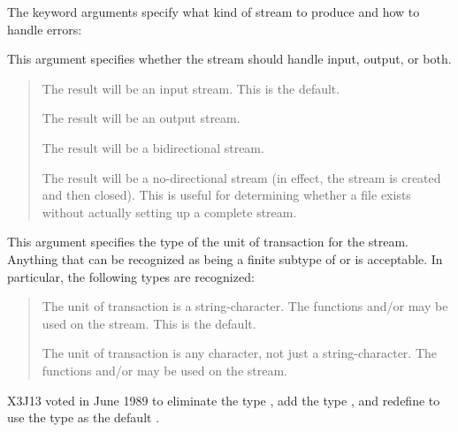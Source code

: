 \begin{defun}[Function]
The keyword arguments specify what kind of stream to produce and how
to handle errors:
\begin{flushdesc}
\item[\cd{:direction}]
This argument specifies whether the stream should handle input, output,
or both.
\begin{quotation}
\begin{flushdesc}
\item[\cd{:input}]
The result will be an input stream.  This is the default.

\item[\cd{:output}]
The result will be an output stream.

\item[\cd{:io}]
The result will be a bidirectional stream.

\item[\cd{:probe}]
The result will be a no-directional stream (in effect, the stream
is created and then closed).  This is useful for determining whether
a file exists without actually setting up a complete stream.
\end{flushdesc}
\end{quotation}

\item[\cd{:element-type}]
This argument specifies the type of the unit of transaction for the stream.
Anything that can be recognized as being a finite subtype of
 or  is acceptable.  In particular,
the following types are recognized:

\begin{obsolete}
\begin{quotation}
\begin{flushdesc}
\item[\cd{string-char}]
The unit of transaction is a string-character.
The functions  and/or  may be
used on the stream.  This is the default.

\item[\cd{character}]
The unit of transaction is any character, not just a string-character.
The functions  and/or  may be
used on the stream.
\end{flushdesc}
\end{quotation}
\end{obsolete}

\begin{newer}
X3J13 voted in June 1989 
to eliminate the type , add the type ,
and redefine  to use the type  as the default
.


\end{newer}
\end{flushdesc}
\end{defun}
